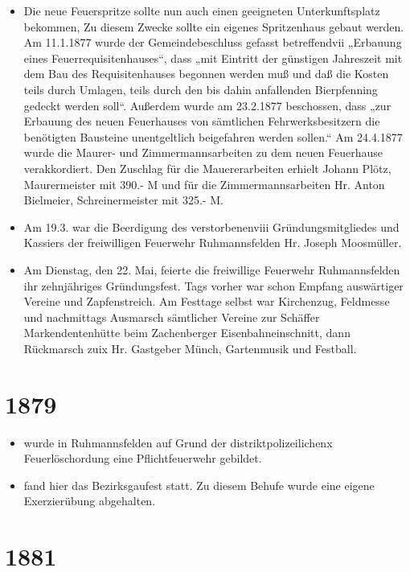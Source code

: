 \documentclass[12pt,a4paper]{book}
\begin{document}
\begin{itemize}
\item Die neue Feuerspritze sollte nun auch einen geeigneten Unterkunftsplatz
bekommen, Zu diesem Zwecke sollte ein eigenes Spritzenhaus gebaut werden. Am
11.1.1877 wurde der Gemeindebeschluss gefasst betreffendvii „Erbauung eines
Feuerrequisitenhauses“, dass „mit Eintritt der günstigen Jahreszeit mit dem Bau
des Requisitenhauses begonnen werden muß und daß die Kosten teils durch Umlagen,
teils durch den bis dahin anfallenden Bierpfenning gedeckt werden soll“.
Außerdem wurde am 23.2.1877 beschossen, dass „zur Erbauung des neuen Feuerhauses
von sämtlichen Fehrwerksbesitzern die benötigten Bausteine unentgeltlich
beigefahren werden sollen.“ Am 24.4.1877 wurde die Maurer- und
Zimmermannsarbeiten zu dem neuen Feuerhause verakkordiert. Den Zuschlag für die
Mauererarbeiten erhielt Johann Plötz, Maurermeister mit 390.- M und für die
Zimmermannsarbeiten Hr. Anton Bielmeier, Schreinermeister mit 325.- M.

\item Am 19.3. war die Beerdigung des verstorbenenviii Gründungsmitgliedes und
Kassiers der freiwilligen Feuerwehr Ruhmannsfelden Hr. Joseph Moosmüller.

\item Am Dienstag, den 22. Mai, feierte die freiwillige Feuerwehr Ruhmannsfelden
ihr zehnjähriges Gründungsfest. Tags vorher war schon Empfang auswärtiger
Vereine und Zapfenstreich. Am Festtage selbst war Kirchenzug, Feldmesse und
nachmittags Ausmarsch sämtlicher Vereine zur Schäffer Markendentenhütte beim
Zachenberger Eisenbahneinschnitt, dann Rückmarsch zuix Hr. Gastgeber Münch,
Gartenmusik und Festball.
\end{itemize}

\section*{1879}

\begin{itemize}
\item wurde in Ruhmannsfelden auf Grund der distriktpolizeilichenx
Feuerlöschordung eine Pflichtfeuerwehr gebildet.

\item fand hier das Bezirksgaufest statt. Zu diesem Behufe wurde eine eigene
Exerzierübung abgehalten.
\end{itemize}

\section*{1881}
\end{document}
